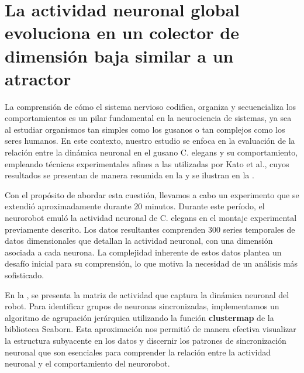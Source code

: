 \section{La actividad neuronal global evoluciona en un colector de dimensión baja similar a un atractor}

La comprensión de cómo el sistema nervioso codifica, organiza y secuencializa los comportamientos es un pilar fundamental en la neurociencia de sistemas, ya sea al estudiar organismos tan simples como los gusanos o tan complejos como los seres humanos. En este contexto, nuestro estudio se enfoca en la evaluación de la relación entre la dinámica neuronal en el gusano C. elegans y su comportamiento, empleando técnicas experimentales afines a las utilizadas por Kato et al., cuyos resultados se presentan de manera resumida en la  y se ilustran en la .

Con el propósito de abordar esta cuestión, llevamos a cabo un experimento que se extendió aproximadamente durante 20 minutos. Durante este período, el neurorobot emuló la actividad neuronal de C. elegans en el montaje experimental previamente descrito. Los datos resultantes comprenden 300 series temporales de datos dimensionales que detallan la actividad neuronal, con una dimensión asociada a cada neurona. La complejidad inherente de estos datos plantea un desafío inicial para su comprensión, lo que motiva la necesidad de un análisis más sofisticado.

En la , se presenta la matriz de actividad que captura la dinámica neuronal del robot. Para identificar grupos de neuronas sincronizadas, implementamos un algoritmo de agrupación jerárquica utilizando la función \textbf{clustermap} de la biblioteca Seaborn. Esta aproximación nos permitió de manera efectiva visualizar la estructura subyacente en los datos y discernir los patrones de sincronización neuronal que son esenciales para comprender la relación entre la actividad neuronal y el comportamiento del neurorobot.


